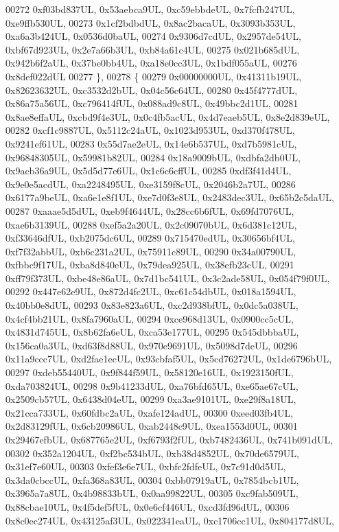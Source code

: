 \begin{DoxyCode}
00272     0xf03bd837UL, 0x53aebca9UL, 0xc59ebbdeUL, 0x7fcfb247UL, 0xe9ffb530UL,
00273     0x1cf2bdbdUL, 0x8ac2bacaUL, 0x3093b353UL, 0xa6a3b424UL, 0x0536d0baUL,
00274     0x9306d7cdUL, 0x2957de54UL, 0xbf67d923UL, 0x2e7a66b3UL, 0xb84a61c4UL,
00275     0x021b685dUL, 0x942b6f2aUL, 0x37be0bb4UL, 0xa18e0cc3UL, 0x1bdf055aUL,
00276     0x8def022dUL
00277   \},
00278   \{
00279     0x00000000UL, 0x41311b19UL, 0x82623632UL, 0xc3532d2bUL, 0x04c56c64UL,
00280     0x45f4777dUL, 0x86a75a56UL, 0xc796414fUL, 0x088ad9c8UL, 0x49bbc2d1UL,
00281     0x8ae8effaUL, 0xcbd9f4e3UL, 0x0c4fb5acUL, 0x4d7eaeb5UL, 0x8e2d839eUL,
00282     0xcf1c9887UL, 0x5112c24aUL, 0x1023d953UL, 0xd370f478UL, 0x9241ef61UL,
00283     0x55d7ae2eUL, 0x14e6b537UL, 0xd7b5981cUL, 0x96848305UL, 0x59981b82UL,
00284     0x18a9009bUL, 0xdbfa2db0UL, 0x9acb36a9UL, 0x5d5d77e6UL, 0x1c6c6cffUL,
00285     0xdf3f41d4UL, 0x9e0e5acdUL, 0xa2248495UL, 0xe3159f8cUL, 0x2046b2a7UL,
00286     0x6177a9beUL, 0xa6e1e8f1UL, 0xe7d0f3e8UL, 0x2483dec3UL, 0x65b2c5daUL,
00287     0xaaae5d5dUL, 0xeb9f4644UL, 0x28cc6b6fUL, 0x69fd7076UL, 0xae6b3139UL,
00288     0xef5a2a20UL, 0x2c09070bUL, 0x6d381c12UL, 0xf33646dfUL, 0xb2075dc6UL,
00289     0x715470edUL, 0x30656bf4UL, 0xf7f32abbUL, 0xb6c231a2UL, 0x75911c89UL,
00290     0x34a00790UL, 0xfbbc9f17UL, 0xba8d840eUL, 0x79dea925UL, 0x38efb23cUL,
00291     0xff79f373UL, 0xbe48e86aUL, 0x7d1bc541UL, 0x3c2ade58UL, 0x054f79f0UL,
00292     0x447e62e9UL, 0x872d4fc2UL, 0xc61c54dbUL, 0x018a1594UL, 0x40bb0e8dUL,
00293     0x83e823a6UL, 0xc2d938bfUL, 0x0dc5a038UL, 0x4cf4bb21UL, 0x8fa7960aUL,
00294     0xce968d13UL, 0x0900cc5cUL, 0x4831d745UL, 0x8b62fa6eUL, 0xca53e177UL,
00295     0x545dbbbaUL, 0x156ca0a3UL, 0xd63f8d88UL, 0x970e9691UL, 0x5098d7deUL,
00296     0x11a9ccc7UL, 0xd2fae1ecUL, 0x93cbfaf5UL, 0x5cd76272UL, 0x1de6796bUL,
00297     0xdeb55440UL, 0x9f844f59UL, 0x58120e16UL, 0x1923150fUL, 0xda703824UL,
00298     0x9b41233dUL, 0xa76bfd65UL, 0xe65ae67cUL, 0x2509cb57UL, 0x6438d04eUL,
00299     0xa3ae9101UL, 0xe29f8a18UL, 0x21cca733UL, 0x60fdbc2aUL, 0xafe124adUL,
00300     0xeed03fb4UL, 0x2d83129fUL, 0x6cb20986UL, 0xab2448c9UL, 0xea1553d0UL,
00301     0x29467efbUL, 0x687765e2UL, 0xf6793f2fUL, 0xb7482436UL, 0x741b091dUL,
00302     0x352a1204UL, 0xf2bc534bUL, 0xb38d4852UL, 0x70de6579UL, 0x31ef7e60UL,
00303     0xfef3e6e7UL, 0xbfc2fdfeUL, 0x7c91d0d5UL, 0x3da0cbccUL, 0xfa368a83UL,
00304     0xbb07919aUL, 0x7854bcb1UL, 0x3965a7a8UL, 0x4b98833bUL, 0x0aa99822UL,
00305     0xc9fab509UL, 0x88cbae10UL, 0x4f5def5fUL, 0x0e6cf446UL, 0xcd3fd96dUL,
00306     0x8c0ec274UL, 0x43125af3UL, 0x022341eaUL, 0xc1706cc1UL, 0x804177d8UL,

\end{DoxyCode}
